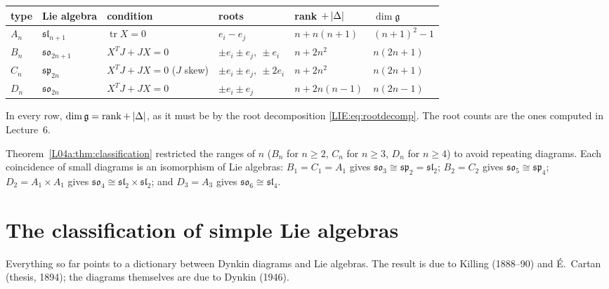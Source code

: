 \begin{center}
\renewcommand{\arraystretch}{1.25}
\begin{tabular}{llllll}
\toprule
type & Lie algebra & condition & roots & rank $+\left\lvert \Delta \right\rvert$ & $\dim\mathfrak g$\\
\midrule
$A_n$ & $\mathfrak{sl}_{n+1}$ & $\operatorname{tr}X=0$ & $e_i-e_j$ & $n+n(n+1)$ & $(n+1)^2-1$\\
$B_n$ & $\mathfrak{so}_{2n+1}$ & $X^TJ+JX=0$ & $\pm e_i\pm e_j,\ \pm e_i$ & $n+2n^2$ & $n(2n+1)$\\
$C_n$ & $\mathfrak{sp}_{2n}$ & $X^TJ+JX=0$ ($J$ skew) & $\pm e_i\pm e_j,\ \pm2e_i$ & $n+2n^2$ & $n(2n+1)$\\
$D_n$ & $\mathfrak{so}_{2n}$ & $X^TJ+JX=0$ & $\pm e_i\pm e_j$ & $n+2n(n-1)$ & $n(2n-1)$\\
\bottomrule
\end{tabular}
\end{center}
In every row, $\dim\mathfrak g=\operatorname{rank}+\left\lvert \Delta \right\rvert$, as it must be by the root decomposition
\eqref{LIE:eq:rootdecomp}. The root counts are the ones computed in Lecture~6.

\begin{remark}
Theorem~\ref{L04a:thm:classification} restricted the ranges of $n$ ($B_n$ for $n\ge2$, $C_n$ for $n\ge3$, $D_n$ for $n\ge4$) to
avoid repeating diagrams. Each coincidence of small diagrams is an isomorphism of Lie algebras:
$B_1=C_1=A_1$ gives $\mathfrak{so}_3\cong\mathfrak{sp}_2=\mathfrak{sl}_2$; $B_2=C_2$ gives
$\mathfrak{so}_5\cong\mathfrak{sp}_4$; $D_2=A_1\times A_1$ gives $\mathfrak{so}_4\cong\mathfrak{sl}_2\times\mathfrak{sl}_2$; and
$D_3=A_3$ gives $\mathfrak{so}_6\cong\mathfrak{sl}_4$.
\end{remark}

\section{The classification of simple Lie algebras}
\label{LIE:sec:classification}

Everything so far points to a dictionary between Dynkin diagrams and Lie algebras. The result is
due to Killing (1888--90) and \'E.~Cartan (thesis, 1894); the diagrams themselves are due to
Dynkin (1946).

